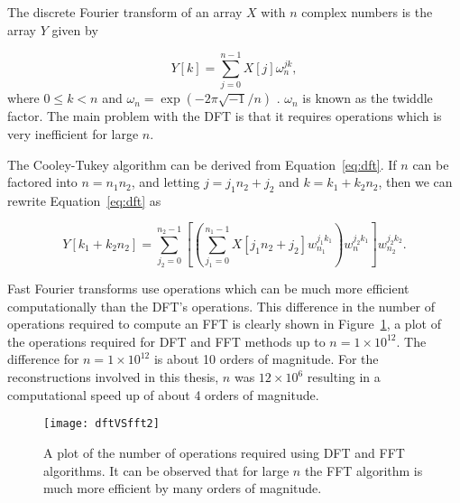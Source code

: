         The discrete Fourier transform of an array $X$ with $n$ complex numbers is the array
        $Y$ given by

        \begin{equation}
            Y[k] = \sum_{j=0}^{n-1}X[j]\omega_n^{jk} ,
            \label{eq:dft}
        \end{equation}
        where $0\le k < n$ and $\omega_n=\exp\left( -2\pi\sqrt{-1}/n \right)$
        \cite{frigo2005design}.
        $\omega_n$ is known as the twiddle factor. The main problem
        with the DFT is that it requires  operations which is very
        inefficient for large $n$.

        The Cooley-Tukey algorithm can be derived from Equation~\ref{eq:dft}. If
        $n$ can be factored into $n=n_1n_2$, and letting $j=j_1n_2+j_2$ and
        $k=k_1+k_2n_2$,
        then we can rewrite
        Equation~\ref{eq:dft} as

        \begin{equation}
            Y[k_1+k_2n_2]=\sum_{j_2=0}^{n_2-1}\left[ \left( \sum_{j_1=0}^{n_1-1}
                X[j_1n_2+j_2]w_{n_1}^{j_1k_1} \right)w_n^{j_2k_1}
            \right]w_{n_2}^{j_2k_2} .
            \end{equation}


            Fast Fourier transforms
            use  operations which can be much more efficient
            computationally than the DFT's  operations. This
            difference in the number of operations required to compute an FFT is clearly shown in
            Figure~\ref{fig:dftVSfft}, a plot of the operations required for
            DFT and FFT methods up to $n=1\times 10^{12}$.
            The difference for $n=1\times 10^{12}$ is about 10 orders of
            magnitude. For the reconstructions involved in this thesis, $n$ was
            $12\times 10^{6}$ resulting in a computational speed up of about 4
            orders of magnitude.

            \begin{figure}[htbp!]
                \begin{center}
                    \texttt{[image: dftVSfft2]}
                \end{center}
                \caption{A plot of the number of operations required using DFT
                and FFT algorithms. It can be observed that for large $n$ the
            FFT algorithm is much more efficient by many orders of magnitude.}
                \label{fig:dftVSfft}
            \end{figure}


